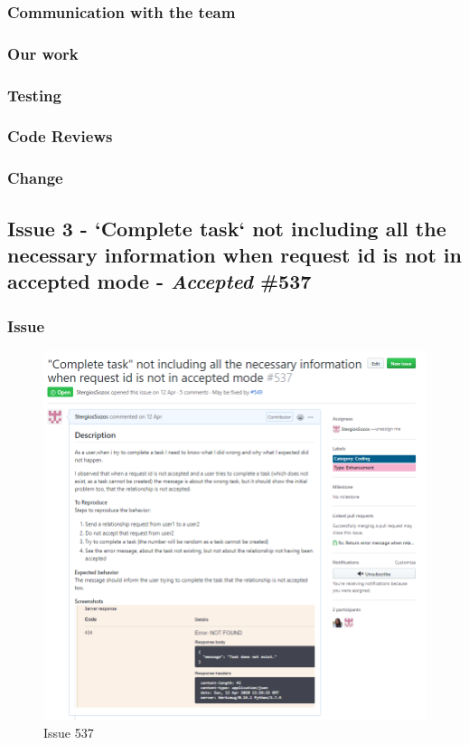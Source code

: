 \documentclass{article}
\begin{document}
\vfill
\clearpage

\subsubsection{Communication with the team}

\subsubsection{Our work}
\subsubsection{Testing}
\subsubsection{Code Reviews}
\subsubsection{Change}
\subsection{Issue 3 - `Complete task` not including all the necessary information when request id is not in accepted mode - \emph{Accepted} \#537}

\subsubsection{Issue}
\begin{figure}[tph!]
\centerline{\includegraphics[totalheight=15cm, width=16cm]{issue537.png}}
    \caption{Issue 537}
    \label{fig:verticalcell}
\end{figure}
\end{document}
